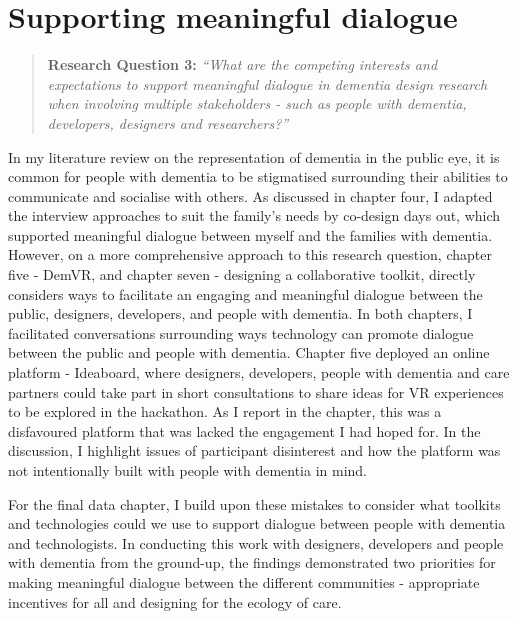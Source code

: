 \section{Supporting meaningful dialogue}
\label{Discussion:RQ3}
\begin{quote}
\textbf{    Research Question 3:
}    
\textit{ “What are the competing interests and expectations to support meaningful dialogue in dementia design research when involving multiple stakeholders - such as people with dementia, developers, designers and researchers?”}
\end{quote}
In my literature review on the representation of dementia in the public eye, it is common for people with dementia to be stigmatised surrounding their abilities to communicate and socialise with others. As discussed in chapter four, I adapted the interview approaches to suit the family's needs by co-design days out, which supported meaningful dialogue between myself and the families with dementia. However, on a more comprehensive approach to this research question, chapter five - DemVR, and chapter seven - designing a collaborative toolkit, directly considers ways to facilitate an engaging and meaningful dialogue between the public, designers, developers, and people with dementia. In both chapters, I facilitated conversations surrounding ways technology can promote dialogue between the public and people with dementia. Chapter five deployed an online platform - Ideaboard, where designers, developers, people with dementia and care partners could take part in short consultations to share ideas for VR experiences to be explored in the hackathon. As I report in the chapter, this was a disfavoured platform that was lacked the engagement I had hoped for. In the discussion, I highlight issues of participant disinterest and how the platform was not intentionally built with people with dementia in mind. 

For the final data chapter, I build upon these mistakes to consider what toolkits and technologies could we use to support dialogue between people with dementia and technologists. In conducting this work with designers, developers and people with dementia from the ground-up, the findings demonstrated two priorities for making meaningful dialogue between the different communities - appropriate incentives for all and designing for the ecology of care.


